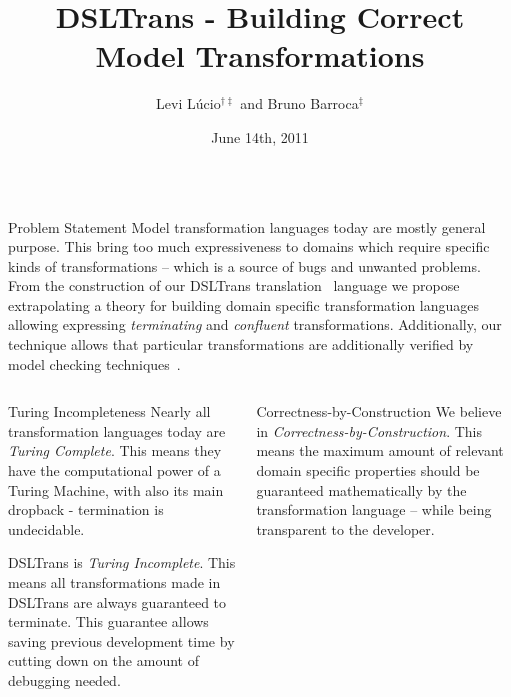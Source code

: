 \documentclass[final,hyperref={pdfpagelabels=false}]{beamer}
\title[Fancy Posters]{DSLTrans - Building Correct Model Transformations}
\author[Dreuw \& Deselaers]{Levi L\'ucio$^{\dagger\ddagger}$ and Bruno
  Barroca$^{\ddagger}$}
\institute[McGill University]{$^{\dagger}$McGill University, Montreal,
  Canada\qquad $^{\ddagger}$Universidade Nova de Lisboa, Lisbon, Portugal}
\date[June 14th, 2011]{June 14th, 2011}
\begin{document}
  \begin{frame}{} 
      \begin{columns}[t]
        \begin{column}{.993\linewidth}
        \begin{block}{\large Problem Statement}
   		Model transformation languages today are mostly general purpose. This
   		bring too much expressiveness to domains which require specific kinds of
   		transformations -- which is a source of bugs and unwanted problems. From
   		the construction of our DSLTrans translation~\cite{SLE2010} language we
   		propose extrapolating a theory for building
   		domain specific transformation languages allowing expressing
   		\emph{terminating} and \emph{confluent} transformations. Additionally,
   		our technique allows that particular transformations are additionally
   		verified by model checking techniques~\cite{MODELS2010}.
        \end{block}
        \end{column}
      \end{columns}         

    \vspace{0.5cm}

    \begin{columns}[t]
      \begin{column}{.485\linewidth}
        \begin{block}{Turing Incompleteness}
        Nearly all transformation languages today are \emph{Turing Complete}.
        This means they have the computational power of a Turing Machine, with also
        its main dropback - termination is undecidable.
        
        DSLTrans is \emph{Turing Incomplete}. This means all transformations
        made in DSLTrans are always guaranteed to terminate. This guarantee
        allows saving previous development time by cutting down on the amount of
        debugging needed.
        \end{block}
      \end{column}

      \begin{column}{.485\linewidth}
        \begin{block}{Correctness-by-Construction}
        We believe in \emph{Correctness-by-Construction}. This means the maximum
        amount of relevant domain specific properties should be guaranteed
        mathematically by the transformation language -- while being transparent
        to the developer.
        

\end{block}
\end{column}
\end{columns}
\end{frame}
\end{document}
